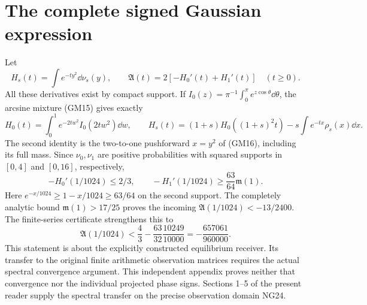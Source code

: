 \documentclass[11pt]{article}
\begin{document}
\section{The complete signed Gaussian expression}
Let
\begin{equation}\tag{GM23}
 H_s(t)=\int e^{-ty^2}\dd\nu_s(y),\qquad
 \mathfrak A(t)=2[-H_0'(t)+H_1'(t)]\quad(t\ge0).
\end{equation}
All these derivatives exist by compact support. If
$I_0(z)=\pi^{-1}\int_0^\pi e^{z\cos\theta}\dd\theta$, the arcsine
mixture (GM15) gives exactly
\begin{equation}\tag{GM24}
 H_0(t)=\int_0^1e^{-2tw^2}I_0(2tw^2)\dd w,\qquad
 H_s(t)=(1+s)H_0((1+s)^2t)-s\int e^{-tx}\rho_s(x)\dd x.
\end{equation}
The second identity is the two-to-one pushforward $x=y^2$ of (GM16),
including its full mass. Since $\nu_0,\nu_1$ are positive probabilities
with squared supports in $[0,4]$ and $[0,16]$, respectively,
\[
 -H_0'(1/1024)\le2/3,\qquad
 -H_1'(1/1024)\ge\frac{63}{64}\mathfrak m(1).
\]
Here $e^{-x/1024}\ge1-x/1024\ge63/64$ on the second support.
The completely analytic bound $\mathfrak m(1)>17/25$ proves the incoming
$\mathfrak A(1/1024)<-13/2400$. The finite-series certificate strengthens
this to
\begin{equation}\tag{GM25}
 \boxed{\mathfrak A(1/1024)
 <\frac43-\frac{63}{32}\frac{10249}{10000}
 =-\frac{657061}{960000}.}
\end{equation}
This statement is about the explicitly constructed equilibrium receiver.
Its transfer to the original finite arithmetic observation matrices
requires the actual spectral convergence argument. This independent appendix proves neither that convergence nor the individual projected phase signs. Sections 1--5 of the present reader supply the spectral transfer on the precise observation domain NG24.
\end{document}
